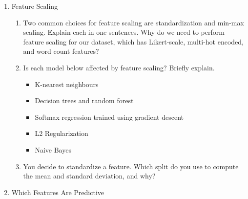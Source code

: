 \documentclass[12pt]{article}
\begin{document}
\begin{enumerate}
\begin{enumerate}
\item What are some strategies to convert the free-text responses to numeric features?

\item One common technique for processing the free-text responses is TF-IDF vectorization. Explain this technique in detail. Why is this technique suitable for processing the free-text data? 

\item How should we handle a word that appears at prediction time but never in the training split?

\item After encoding all the features, you recorded that there are 1100 features and 300 examples. How would the ratio between these two inform your model choices? Why would you choose a simpler model with strong regularization over a larger model?

\end{enumerate}

\item Feature Scaling

\begin{enumerate}

\item Two common choices for feature scaling are standardization and min-max scaling. Explain each in one sentences. Why do we need to perform feature scaling for our dataset, which has Likert-scale, multi-hot encoded, and word count features? 

\item Is each model below affected by feature scaling? Briefly explain.
\begin{itemize}
\item K-nearest neighbours
\item Decision trees and random forest
\item Softmax regression trained using gradient descent
\item L2 Regularization
\item Naive Bayes
\end{itemize}

\item You decide to standardize a feature. Which split do you use to compute the mean and standard deviation, and why?

\end{enumerate}

\item Which Features Are Predictive


\end{enumerate}
\end{document}
